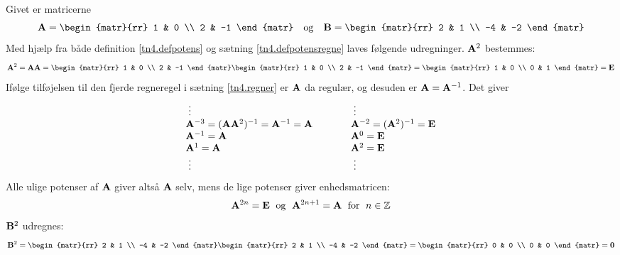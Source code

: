 \begin{example}
Givet er matricerne
\begin{equation}
\mA = \begin{matr}{rr} 1 & 0 \\ 2 & -1 \end{matr} \quad \mathrm{og} \quad \mB = \begin{matr}{rr} 2 & 1 \\ -4 & -2 \end{matr}
\end{equation}
Med hjælp fra både definition \ref{tn4.defpotens} og sætning \ref{tn4.defpotensregne} laves følgende udregninger. $ \mathbf{A}^2 $ bestemmes:
\begin{equation}
\mA^2 = \mA\mA = \begin{matr}{rr} 1 & 0 \\ 2 & -1 \end{matr} \begin{matr}{rr} 1 & 0 \\ 2 & -1 \end{matr} = \begin{matr}{rr} 1 & 0 \\ 0 & 1 \end{matr} = \mE
\end{equation}
Ifølge tilføjelsen til den fjerde regneregel i sætning \ref{tn4.regner} er $ \mathbf{A} $ da regulær, og desuden er $ \mathbf{A} = \mathbf{A}^{-1} $. Det giver
\begin{equation}
\begin{array}{ll}
\; \vdots & \; \vdots \\
\mathbf{A}^{-3} = (\mathbf{A}\mathbf{A}^2)^{-1} = \mathbf{A}^{-1} = \mathbf{A} \hspace*{1cm} & \mathbf{A}^{-2} = (\mathbf{A}^2)^{-1} = \mathbf{E} \\
\mathbf{A}^{-1} = \mathbf{A} & \mathbf{A}^0 = \mathbf{E} \\
\mathbf{A}^1 = \mathbf{A} & \mathbf{A}^2 = \mathbf{E} \\
\; \vdots & \; \vdots \\
\end{array}
\end{equation}
Alle ulige potenser af $ \mathbf{A} $ giver altså $ \mathbf{A} $ selv, mens de lige potenser giver enhedsmatricen:
\begin{equation}
\mathbf{A}^{2n} = \mathbf{E} \; \mathrm{~og~} \; \mathbf{A}^{2n+1} = \mathbf{A} \; \mathrm{~for~} \; n \in \mathbb{Z}
\end{equation}
$ \mathbf{B}^2 $ udregnes:
\begin{equation}
\mB^2 = \begin{matr}{rr} 2 & 1 \\ -4 & -2 \end{matr}\begin{matr}{rr} 2 & 1 \\ -4 & -2 \end{matr} = \begin{matr}{rr} 0 & 0 \\ 0 & 0 \end{matr} = \mnul

\end{equation}
\end{example}
